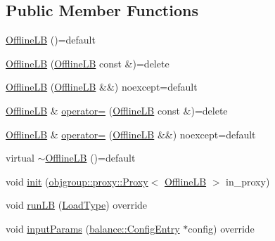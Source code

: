 \subsection*{Public Member Functions}
\begin{DoxyCompactItemize}
\item 
\hyperlink{structvt_1_1vrt_1_1collection_1_1lb_1_1_offline_l_b_a99528b3cbbb7cf3a3ffe298dd7f8b98a}{Offline\+LB} ()=default
\item 
\hyperlink{structvt_1_1vrt_1_1collection_1_1lb_1_1_offline_l_b_afb45e5b5adb6761c53877de9c4e7e4b1}{Offline\+LB} (\hyperlink{structvt_1_1vrt_1_1collection_1_1lb_1_1_offline_l_b}{Offline\+LB} const \&)=delete
\item 
\hyperlink{structvt_1_1vrt_1_1collection_1_1lb_1_1_offline_l_b_a26accbf7d8c123dc9594e64ec7eb8161}{Offline\+LB} (\hyperlink{structvt_1_1vrt_1_1collection_1_1lb_1_1_offline_l_b}{Offline\+LB} \&\&) noexcept=default
\item 
\hyperlink{structvt_1_1vrt_1_1collection_1_1lb_1_1_offline_l_b}{Offline\+LB} \& \hyperlink{structvt_1_1vrt_1_1collection_1_1lb_1_1_offline_l_b_a94affec36f4542b31b67748b17f577bb}{operator=} (\hyperlink{structvt_1_1vrt_1_1collection_1_1lb_1_1_offline_l_b}{Offline\+LB} const \&)=delete
\item 
\hyperlink{structvt_1_1vrt_1_1collection_1_1lb_1_1_offline_l_b}{Offline\+LB} \& \hyperlink{structvt_1_1vrt_1_1collection_1_1lb_1_1_offline_l_b_a2d6408b68d2f1eb5b59d78715e0915d5}{operator=} (\hyperlink{structvt_1_1vrt_1_1collection_1_1lb_1_1_offline_l_b}{Offline\+LB} \&\&) noexcept=default
\item 
virtual \hyperlink{structvt_1_1vrt_1_1collection_1_1lb_1_1_offline_l_b_a72e0da5f0731ce6290d8bbcc505e4d7a}{$\sim$\+Offline\+LB} ()=default
\item 
void \hyperlink{structvt_1_1vrt_1_1collection_1_1lb_1_1_offline_l_b_a872df3cf9b5018b990ef9029f7bf9110}{init} (\hyperlink{structvt_1_1objgroup_1_1proxy_1_1_proxy}{objgroup\+::proxy\+::\+Proxy}$<$ \hyperlink{structvt_1_1vrt_1_1collection_1_1lb_1_1_offline_l_b}{Offline\+LB} $>$ in\+\_\+proxy)
\item 
void \hyperlink{structvt_1_1vrt_1_1collection_1_1lb_1_1_offline_l_b_ad6b473ed506c50b86e308fc9840a11d7}{run\+LB} (\hyperlink{namespacevt_a8fb51741340b87d7aaee0bef60e9896b}{Load\+Type}) override
\item 
void \hyperlink{structvt_1_1vrt_1_1collection_1_1lb_1_1_offline_l_b_a00fdf3796bc26affb03f45f5570560b6}{input\+Params} (\hyperlink{structvt_1_1vrt_1_1collection_1_1balance_1_1_config_entry}{balance\+::\+Config\+Entry} $\ast$config) override
\end{DoxyCompactItemize}
